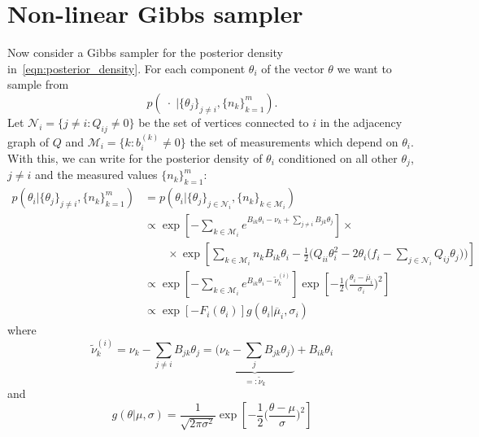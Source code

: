 \documentclass[11pt]{article}
\begin{document}
\section{Non-linear Gibbs sampler}
Now consider a Gibbs sampler for the posterior density in~\eqref{eqn:posterior_density}. For each component $\theta_i$ of the vector $\theta$ we want to sample from
\begin{equation}
    p(\;\cdot\;|\{\theta_j\}_{j\ne i},\{n_k\}_{k=1}^{m}).\label{eqn:single_site_density}
\end{equation}
Let $\mathcal{N}_i=\{j\neq i:Q_{ij}\neq 0\}$ be the set of vertices connected to $i$ in the adjacency graph of $Q$ and $\mathcal{M}_i = \{k:b^{(k)}_i\ne 0\}$ the set of measurements which depend on $\theta_i$. With this, we can write for the posterior density of $\theta_i$ conditioned on all other $\theta_{j}$, $j\neq i$ and the measured values $\{n_k\}_{k=1}^m$:
\begin{equation}
    \begin{aligned}
    p(\theta_i|\{\theta_j\}_{j\ne i},\{n_k\}_{k=1}^{m}) &= 
    p(\theta_i|\{\theta_j\}_{j\in\mathcal{N}_i},\{n_k\}_{k\in \mathcal{M}_i})\\
    &\propto\exp\left[-\sum_{k\in\mathcal{M}_i} e^{B_{ik} \theta_i -\nu_k+\sum_{j\ne i} B_{jk}\theta_j} \right]\times\\
    &\qquad
    \times \exp\left[\sum_{k\in\mathcal{M}_i} n_k B_{ik} \theta_i -\frac{1}{2}\Big(Q_{ii}\theta_i^2-2\theta_i\big(f_i-\sum_{j\in\mathcal{N}_i} Q_{ij}\theta_j\big)\Big)\right]\\
    &\propto 
    \exp\left[-\sum_{k\in\mathcal{M}_i} e^{B_{ik} \theta_i -\widetilde{\nu}_k^{(i)}} \right]\exp\left[-\frac{1}{2}\Big(\frac{\theta_i-\overline{\mu}_i}{\sigma_i}\Big)^2\right]\\
    &\propto \exp\left[-F_i(\theta_i)\right] g(\theta_i|\overline{\mu}_i,\sigma_i)
    \end{aligned}\label{eqn:posterior_density_single_site}
\end{equation}
where
\begin{equation}
\widetilde{\nu}_k^{(i)} = \nu_k - \sum_{j\neq i} B_{jk} \theta_j = \underbrace{\Big(\nu_k - \sum_{j} B_{jk} \theta_j\Big)}_{=:\widetilde{\nu}_k} + B_{ik} \theta_i
\end{equation}
and
\begin{equation}
    g(\theta|\mu,\sigma) = \frac{1}{\sqrt{2\pi\sigma^2}}\exp\left[-\frac{1}{2}\Big(\frac{\theta-\mu}{\sigma}\Big)^2\right]
\end{equation}
\end{document}
